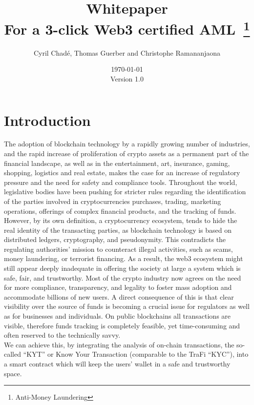 ﻿\documentclass[a4paper]{article}
\newcommand{\version}{\vspace{10pt}\\ Version 1.0}
\begin{document}
\title{Whitepaper \vspace{10pt} \\
\large For a 3-click Web3 certified AML~\footnote{Anti-Money Laundering}}
\author{Cyril Chad\'e, Thomas Guerber and Christophe Ramananjaona}
\date{\today\version}
\maketitle
\thispagestyle{fancy}
\tableofcontents
\newpage
\section{Introduction}

The adoption of blockchain technology by a rapidly growing number of industries, and the rapid increase of proliferation of crypto assets as a permanent part of the financial landscape, as well as in the entertainment, art, insurance, gaming, shopping, logistics and real estate, makes the case for an increase of regulatory pressure and the need for safety and compliance tools. Throughout the world, legislative bodies have been pushing for stricter rules regarding the identification of the parties involved in cryptocurrencies purchases, trading, marketing operations, offerings of complex financial products, and the tracking of funds.
However, by its own definition, a cryptocurrency ecosystem, tends to hide the real identity of the transacting parties, as blockchain technology is based on distributed ledgers, cryptography, and pseudonymity. This contradicts the regulating authorities’ mission to counteract illegal activities, such as scams, money laundering, or terrorist financing. As a result, the web3 ecosystem might still appear deeply inadequate in offering the society at large a system which is safe, fair, and trustworthy. 
Most of the crypto industry now agrees on the need for more compliance, transparency, and legality to foster mass adoption and accommodate billions of new users. A direct consequence of this is that clear visibility over the source of funds is becoming a crucial issue for regulators as well as for businesses and individuals. On public blockchains all transactions are visible, therefore funds tracking is completely feasible, yet time-consuming and often reserved to the technically savvy. \\

We can achieve this, by integrating the analysis of on-chain transactions, the so-called “KYT” or Know Your Transaction (comparable to the TraFi “KYC”), into a smart contract which will keep the users’ wallet in a safe and trustworthy space. \\
\end{document}
